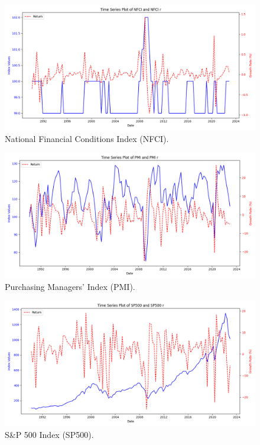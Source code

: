 \documentclass[12pt]{article}
\begin{document}
\begin{figure}[H]
    \centering
    \includegraphics[width=1\linewidth]{plot_NFCI.png}
    \caption{National Financial Conditions Index (NFCI).}
    \label{fig:nfci}
\end{figure}

\begin{figure}[H]
    \centering
    \includegraphics[width=1\linewidth]{plot_PMI.png}
    \caption{Purchasing Managers' Index (PMI).}
    \label{fig:pmi}
\end{figure}

\begin{figure}[H]
    \centering
    \includegraphics[width=1\linewidth]{plot_SP500.png}
    \caption{S\&P 500 Index (SP500).}
    \label{fig:sp500}
\end{figure}
\end{document}
